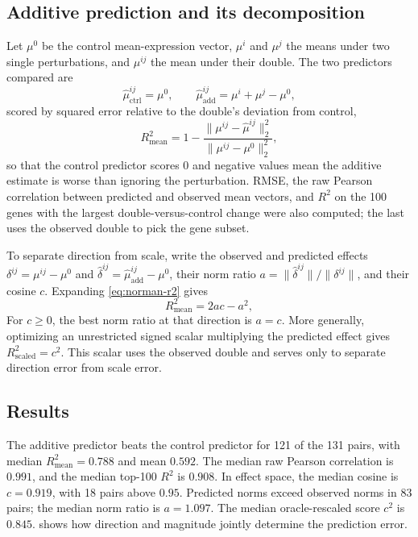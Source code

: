 \documentclass{article}
\begin{document}
\subsection{Additive prediction and its decomposition}

Let $\mu^0$ be the control mean-expression vector, $\mu^i$ and $\mu^j$ the means under two single perturbations, and $\mu^{ij}$ the mean under their double. The two predictors compared are
\begin{equation}
    \widehat\mu^{ij}_{\mathrm{ctrl}}=\mu^0,
    \qquad
    \widehat\mu^{ij}_{\mathrm{add}}=\mu^i+\mu^j-\mu^0,
    \label{eq:norman-additive}
\end{equation}
scored by squared error relative to the double's deviation from control,
\begin{equation}
    R^2_{\mathrm{mean}}
    =1-\frac{\lVert \mu^{ij}-\widehat\mu^{ij}\rVert_2^2}
             {\lVert \mu^{ij}-\mu^0\rVert_2^2},
    \label{eq:norman-r2}
\end{equation}
so that the control predictor scores $0$ and negative values mean the additive estimate is worse than ignoring the perturbation. RMSE, the raw Pearson correlation between predicted and observed mean vectors, and $R^2$ on the 100 genes with the largest double-versus-control change were also computed; the last uses the observed double to pick the gene subset.

To separate direction from scale, write the observed and predicted effects $\delta^{ij}=\mu^{ij}-\mu^0$ and $\widehat\delta^{ij}=\widehat\mu^{ij}_{\mathrm{add}}-\mu^0$, their norm ratio $a=\lVert\widehat\delta^{ij}\rVert/\lVert\delta^{ij}\rVert$, and their cosine $c$. Expanding \cref{eq:norman-r2} gives
\begin{equation}
    R^2_{\mathrm{mean}}=2ac-a^2,
    \label{eq:direction-magnitude}
\end{equation}
For $c\geq0$, the best norm ratio at that direction is $a=c$. More generally, optimizing an unrestricted signed scalar multiplying the predicted effect gives $R^2_{\mathrm{scaled}}=c^2$. This scalar uses the observed double and serves only to separate direction error from scale error.

\subsection{Results}

The additive predictor beats the control predictor for 121 of the 131 pairs, with median $R^2_{\mathrm{mean}}=0.788$ and mean $0.592$. The median raw Pearson correlation is $0.991$, and the median top-100 $R^2$ is $0.908$. In effect space, the median cosine is $c=0.919$, with 18 pairs above $0.95$. Predicted norms exceed observed norms in 83 pairs; the median norm ratio is $a=1.097$. The median oracle-rescaled score $c^2$ is $0.845$.  shows how direction and magnitude jointly determine the prediction error.
\end{document}
